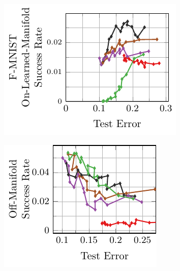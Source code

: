\begin{appendix}
\begin{figure}[t]
\begin{subfigure}{0.245\textwidth}
        \includegraphics[width=\textwidth]{appendix_transfer_fashion_error_on_learned.pdf}
    \end{subfigure}
    \begin{subfigure}{0.225\textwidth}
        \centering
        \includegraphics[width=\textwidth]{appendix_transfer_fashion_error_off.pdf}
    \end{subfigure}
    \\
\end{figure}
\end{appendix}
